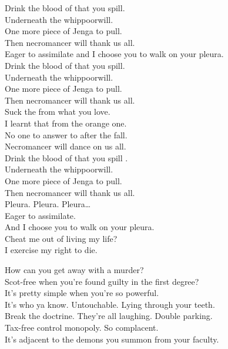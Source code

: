 Drink the blood of that you spill. \\
Underneath the whippoorwill. \\
One more piece of Jenga to pull. \\
Then necromancer will thank us all. \\

Eager to assimilate and I choose you to walk on your pleura. \\

Drink the blood of that you spill. \\
Underneath the whippoorwill. \\
One more piece of Jenga to pull. \\
Then necromancer will thank us all. \\
Suck the  from what you love. \\
I learnt that from the orange one. \\
No one to answer to after the fall. \\
Necromancer will dance on us all. \\
Drink the blood of that you spill . \\
Underneath the whippoorwill. \\
One more piece of Jenga to pull. \\
Then necromancer will thank us all. \\

Pleura. Pleura. Pleura… \\

Eager to assimilate. \\
And I choose you to walk on your pleura. \\
Cheat me out of living my life? \\
I exercise my right to die. \\




How can you get away with a murder? \\
Scot-free when you're found guilty in the first degree? \\
It's pretty simple when you're so powerful. \\
It's who ya know. Untouchable. Lying through your teeth. \\
Break the doctrine. They're all laughing. Double parking. \\
Tax-free control monopoly. So complacent. \\
It's adjacent to the demons you summon from your faculty. \\


